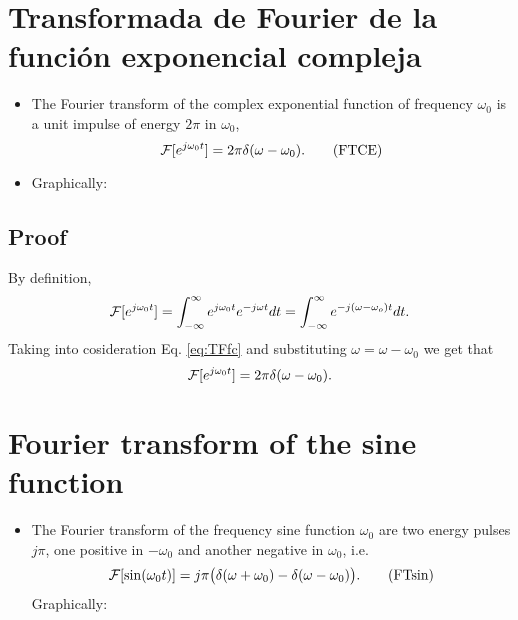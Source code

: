 \section{Transformada de Fourier de la funci\'on exponencial compleja}
\begin{itemize}
\item The Fourier transform of the complex exponential function of
  frequency $\omega_0$ is a unit impulse of energy $2\pi$ in $\omega_0$,
  \begin{equation}
    {\cal F }[e^{j\omega_0t}] = 2\pi\delta(\omega-\omega_0).
    \tag{FTCE}
    \label{eq:FTCE}
  \end{equation}
\item Graphically:
\end{itemize}

\subsection*{Proof}
\noindent By definition,
\begin{equation*}
  {\cal F}[e^{j\omega_0t}] = \int_{-\infty}^\infty e^{j\omega_0t}e^{-j\omega t} dt =
  \int_{-\infty}^\infty e^{-j(\omega-\omega_o)t}dt.
\end{equation*}
Taking into cosideration Eq. \ref{eq:TFfc} and substituting 
$\omega=\omega-\omega_0$ we get that
\begin{equation*}
  {\cal F}[e^{j\omega_0t}] = 2\pi\delta(\omega-\omega_0).
\end{equation*}

\section{Fourier transform of the sine function}
\begin{itemize}
\item The Fourier transform of the frequency sine function $\omega_0$ are two
  energy pulses $j\pi$, one positive in $-\omega_0$ and another negative in $\omega_0$,
  i.e.
  \begin{equation}
    {\cal F}[\sin(\omega_0t)] = j\pi\big(\delta(\omega+\omega_0)-\delta(\omega-\omega_0)\big).
    \tag{FTsin}
    \label{eq:TFsen}
  \end{equation}
  Graphically:
\end{itemize}

